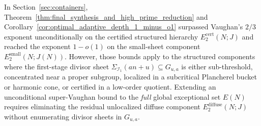 \documentclass[11pt, a4paper]{article}
\theoremstyle{plain}
\theoremstyle{definition}
\begin{document}
In Section~\ref{sec:containers}, Theorem~\ref{thm:final_synthesis_and_high_prime_reduction} and Corollary~\ref{cor:optimal_adaptive_depth_1_minus_o1} surpassed Vaughan's $2/3$ exponent unconditionally on the certified structured hierarchy $E_2^{\mathrm{cert}}(N;J)$ and reached the exponent $1-o(1)$ on the small-sheet component $E_2^{\mathrm{small}}(N;J(N))$. However, those bounds apply to the structured components where the first-stage divisor sheet $\Sigma_{\mathcal{I}_1}(an+u)\subseteq G_{u,a}$ is either sub-threshold, concentrated near a proper subgroup, localized in a subcritical Plancherel bucket or harmonic cone, or certified in a low-order quotient. Extending an unconditional super-Vaughan bound to the \emph{full} global exceptional set $E(N)$ requires eliminating the residual unlocalized diffuse component $E_2^{\mathrm{diffuse}}(N;J)$ without enumerating divisor sheets in $G_{u,a}$.
\end{document}
